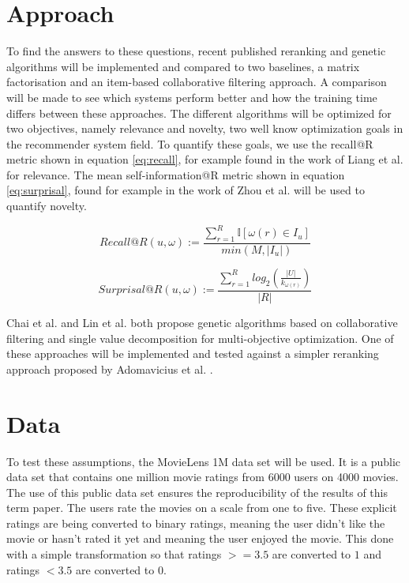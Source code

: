 \section{Approach}
To find the answers to these questions, recent published reranking and genetic algorithms will be implemented and compared to two baselines, a matrix factorisation and an item-based collaborative filtering approach. A comparison will be made to see which systems perform better and how the training time differs between these approaches.
\newline
The different algorithms will be optimized for two objectives, namely relevance and novelty, two well know optimization goals in the recommender system field. To quantify these goals, we use the recall@R metric shown in equation \ref{eq:recall}, for example found in the work of Liang et al. \cite{liang2018variational} for relevance. The mean self-information@R metric shown in equation \ref{eq:surprisal}, found for example in the work of Zhou et al. \cite{zhou2010solving} will be used to quantify novelty.

\begin{equation} \label{eq:recall}
Recall@R(u,\omega) := \frac{\sum\nolimits_{r=1}^R \mathbb{I}[\omega(r) \in I_u]}{min(M, |I_u|)}
\end{equation}

\begin{equation} \label{eq:surprisal}
Surprisal@R(u,\omega) := \frac{\sum\nolimits_{r=1}^R log_2(\frac{|U|}{k_{\omega(r)}})}{|R|}
\end{equation}

Chai et al. \cite{chai2018immune} and Lin et al. \cite{lin2018multiobjective} both propose genetic algorithms based on collaborative filtering and single value decomposition for multi-objective optimization. One of these approaches will be implemented and tested against a simpler reranking approach proposed by Adomavicius et al. \cite{adomavicius2009toward}.


\section{Data}
To test these assumptions, the MovieLens 1M data set will be used. It is a public data set that contains one million movie ratings from 6000 users on 4000 movies. The use of this public data set ensures the reproducibility of the results of this term paper.
\newline
The users rate the movies on a scale from one to five. These explicit ratings are being converted to binary ratings,  meaning the user didn't like the movie or hasn't rated it yet and  meaning the user enjoyed the movie. This done with a simple transformation so that ratings $>= 3.5$ are converted to $1$ and ratings $<3.5$ are converted to $0$.


